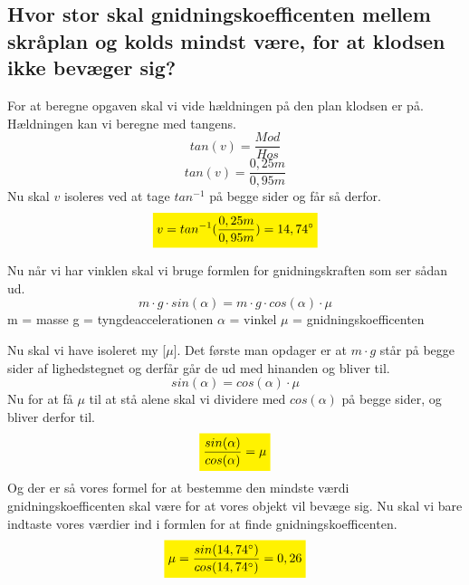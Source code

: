 \subsection{Hvor stor skal gnidningskoefficenten mellem skråplan og kolds mindst være, for at klodsen ikke bevæger sig?}
For at beregne opgaven skal vi vide hældningen på den plan klodsen er på. Hældningen kan vi beregne med tangens.
\begin{equation*}
    tan(v)=\frac{Mod}{Hos}
\end{equation*}
\begin{equation*}
    tan(v)=\frac{0,25m}{0,95m}
\end{equation*}
Nu skal $v$ isoleres ved at tage $tan^{-1}$ på begge sider og får så derfor.
\begin{equation*}
    \mathcolorbox{yellow}{v=tan^{-1}(\frac{0,25m}{0,95m}) = 14,74^{\circ}}
\end{equation*}

Nu når vi har vinklen skal vi bruge formlen for gnidningskraften som ser sådan ud.
\begin{equation*}
    m \cdot g \cdot sin(\alpha) = m \cdot g \cdot cos(\alpha) \cdot \mu
\end{equation*}
m = masse\newline
g = tyngdeaccelerationen\newline
$\alpha$ = vinkel\newline
$\mu$ = gnidningskoefficenten\newline\newline

Nu skal vi have isoleret my [$\mu$]. Det første man opdager er at $m \cdot g$ står på begge sider af lighedstegnet og derfår går de ud med hinanden og bliver til.
\begin{equation*}
    sin(\alpha) = cos(\alpha) \cdot \mu
\end{equation*}
Nu for at få $\mu$ til at stå alene skal vi dividere med $cos(\alpha)$ på begge sider, og bliver derfor til.
\begin{equation*}
    \mathcolorbox{yellow}{\frac{sin(\alpha)}{cos(\alpha)} = \mu}
\end{equation*}
Og der er så vores formel for at bestemme den mindste værdi gnidningskoefficenten skal være for at vores objekt vil bevæge sig.\newline
Nu skal vi bare indtaste vores værdier ind i formlen for at finde gnidningskoefficenten.
\begin{equation*}
    \mathcolorbox{yellow}{\mu = \frac{sin(14,74^{\circ})}{cos(14,74^{\circ})} = 0,26}
\end{equation*}